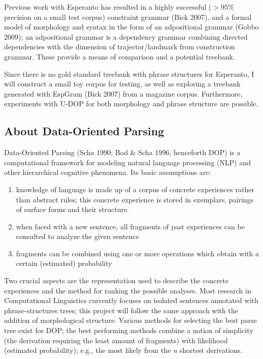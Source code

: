 \documentclass[10pt,a4paper]{article}
\begin{document}
Previous work with Esperanto has resulted in a highly successful
($>95\%$ precision on a small test corpus) constraint grammar (Bick 2007), and
a formal model of morphology and syntax in the form of an adpositional grammar
(Gobbo 2009); an adpositional grammar is a dependency grammar combining
directed dependencies with the dimension of trajector/landmark from
construction grammar. These provide a means of comparison and a potential
treebank.

Since there is no gold standard treebank with phrase structures for Esperanto,
I will construct a small toy corpus for testing, as well as exploring a
treebank generated with EspGram (Bick 2007) from a magazine corpus. Furthermore,
experiments with U-DOP for both morphology and phrase structure are possible.

\subsection{About Data-Oriented Parsing}

Data-Oriented Parsing (Scha 1990; Bod \& Scha 1996, henceforth DOP) is a
computational framework for modeling natural language processing (NLP) and
other hierarchical cognitive phenomena. Its basic assumptions are:

\begin{enumerate}
\item knowledge of language is made up of a corpus of concrete experiences
rather than abstract rules; this concrete experience is stored in
exemplars, pairings of surface forms and their structure.
\item when faced with a new sentence, all fragments of past experiences can be
consulted to analyze the given sentence
\item fragments can be combined using one or more operations which obtain with a
certain (estimated) probability
\end{enumerate}

Two crucial aspects are the representation used to describe the concrete
experiences and the method for ranking the possible analyses. Most research in
Computational Linguistics currently focuses on isolated sentences annotated
with phrase-structures trees; this project will follow the same approach with
the addition of morphological structure. Various methods for selecting the best
parse tree exist for DOP; the best performing methods combine a notion of
simplicity (the derivation requiring the least amount of fragments) with
likelihood (estimated probability); e.g., the most likely from the {\em n} shortest
derivations.
\end{document}

